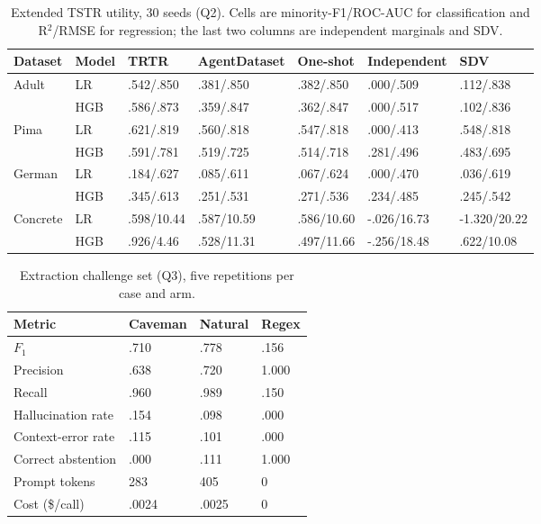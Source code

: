 \documentclass[letterpaper]{article}
\begin{document}
\begin{table}[t]
\centering
\begin{tabular}{lllllll}
\toprule
Dataset & Model & TRTR & AgentDataset & One-shot & Independent & SDV \\
\midrule
Adult & LR & .542/.850 & .381/.850 & .382/.850 & .000/.509 & .112/.838 \\
 & HGB & .586/.873 & .359/.847 & .362/.847 & .000/.517 & .102/.836 \\
Pima & LR & .621/.819 & .560/.818 & .547/.818 & .000/.413 & .548/.818 \\
 & HGB & .591/.781 & .519/.725 & .514/.718 & .281/.496 & .483/.695 \\
German & LR & .184/.627 & .085/.611 & .067/.624 & .000/.470 & .036/.619 \\
 & HGB & .345/.613 & .251/.531 & .271/.536 & .234/.485 & .245/.542 \\
\midrule
Concrete & LR & .598/10.44 & .587/10.59 & .586/10.60 & -.026/16.73 & -1.320/20.22 \\
 & HGB & .926/4.46 & .528/11.31 & .497/11.66 & -.256/18.48 & .622/10.08 \\
\bottomrule
\end{tabular}
\caption{Extended TSTR utility, 30 seeds (Q2). Cells are minority-F1/ROC-AUC for classification
and R$^2$/RMSE for regression; the last two columns are independent marginals and SDV.}
\label{tab:utility}
\end{table}

\begin{table}[t]
\centering
\begin{tabular}{llll}
\toprule
Metric & Caveman & Natural & Regex \\
\midrule
$F_1$ & .710 & .778 & .156 \\
Precision & .638 & .720 & 1.000 \\
Recall & .960 & .989 & .150 \\
Hallucination rate & .154 & .098 & .000 \\
Context-error rate & .115 & .101 & .000 \\
Correct abstention & .000 & .111 & 1.000 \\
\midrule
Prompt tokens & 283 & 405 & 0 \\
Cost (\$/call) & .0024 & .0025 & 0 \\
\bottomrule
\end{tabular}
\caption{Extraction challenge set (Q3), five repetitions per case and arm.}
\label{tab:extraction}
\end{table}
\end{document}
